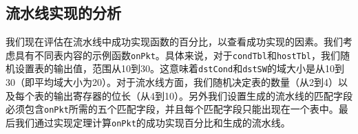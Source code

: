 \begin{table}[t]
\centering
{}

\vspace{2mm}
\caption{流水线的特征结果。}
\label{cap:tbl:table3}
\end{table}



\subsection{流水线实现的分析}

我们现在评估在流水线中成功实现函数的百分比，以查看成功实现的因素。我们考虑具有不同表内容的示例函数\texttt{onPkt}。具体来说，对于\texttt{condTbl}和\texttt{hostTbl}，我们随机设置表的输出值，范围从10到30。这意味着\texttt{dstCond}和\texttt{dstSW}的域大小是从10到30（即平均域大小为20）。对于流水线方面，我们随机决定表的数量（从2到4）以及每个表的输出寄存器的位长（从4到10）。另外我们设置生成的流水线的匹配字段必须包含\texttt{onPkt}所需的五个匹配字段，并且每个匹配字段只能出现在一个表中。最后我们通过实现定理计算\texttt{onPkt}的成功实现百分比和生成的流水线。




